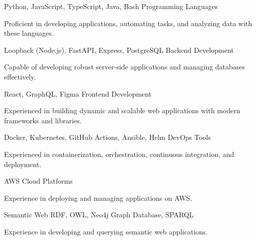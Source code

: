 \begin{cventries}
  \cventry
  {Python, JavaScript, TypeScript, Java, Bash}
  {Programming Languages}
  {}
  {}
  {
    \begin{cvitems}
      \item {Proficient in developing applications, automating tasks, and analyzing data with these languages.}
    \end{cvitems}
  }

  \cventry
  {Loopback (Node.js), FastAPI, Express, PostgreSQL}
  {Backend Development}
  {}
  {}
  {
    \begin{cvitems}
      \item{Capable of developing robust server-side applications and managing databases effectively.}
    \end{cvitems}
  }

  \cventry
  {React, GraphQL, Figma}
  {Frontend Development}
  {}
  {}
  {
    \begin{cvitems}
      \item {Experienced in building dynamic and scalable web applications with modern frameworks and libraries.}
    \end{cvitems}
  }

  \cventry
  {Docker, Kubernetes, GitHub Actions, Ansible, Helm}
  {DevOps Tools}
  {}
  {}
  {
    \begin{cvitems}
      \item {Experienced in containerization, orchestration, continuous integration, and deployment.}
    \end{cvitems}
  }

  \cventry
  {AWS}
  {Cloud Platforms}
  {}
  {}
  {
    \begin{cvitems}
      \item {Experience in deploying and managing applications on AWS.}
    \end{cvitems}
  }


  \cventry
  {Semantic Web}
  {RDF, OWL, Neo4j Graph Database, SPARQL}
  {}
  {}
  {
    \begin{cvitems}
      \item {Experience in developing and querying semantic web applications.}
    \end{cvitems}
  }

\end{cventries}